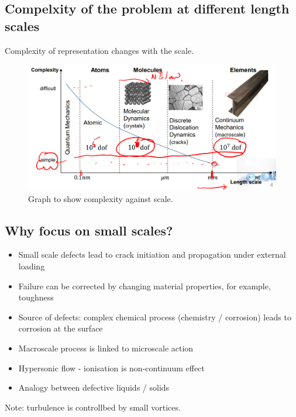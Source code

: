 \subsection{Compelxity of the problem at different length scales}
Complexity of representation changes with the scale.
\begin{figure}[H]
	\centering
	\includegraphics[width = \textwidth]{./img/figure2.png}
	\caption{Graph to show complexity against scale.}
\end{figure}
\subsection{Why focus on small scales?}
\begin{itemize}
	\item Small scale defects lead to crack initiation and propagation under external loading
	\item Failure can be corrected by changing material properties, for example, toughness
	\item Source of defects: complex chemical process (chemistry / corrosion) leads to corrosion at the surface
	\item Macroscale process is linked to microscale action
	\item Hypersonic flow - ionisation is non-continuum effect
	\item Analogy between defective liquids / solids
\end{itemize}
Note: turbulence is controllbed by small vortices.

